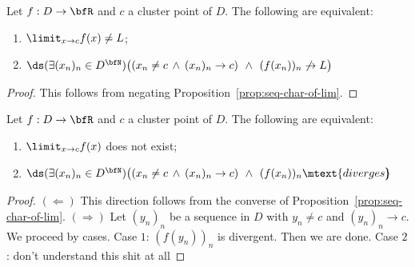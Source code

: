     \begin{theorem}
        Let $f:D \rightarrow \bfR$ and $c$ a cluster point of $D$. The following are equivalent:
            \begin{enumerate}[label = (\arabic*)]
                \item $\displaystyle \limit_{x \rightarrow c}f(x) \neq L$;
                \item $\ds (\exists (x_n)_n \in D^\bfN)\bigl((x_n \neq c \hspace{2pt}\land\hspace{2pt} (x_n)_n \rightarrow c)\hspace{4pt}\land\hspace{4pt} (f(x_n))_n \not\rightarrow L\bigr)$
            \end{enumerate}
    \end{theorem}
        \begin{proof}
            This follows from negating Proposition~\ref{prop:seq-char-of-lim}.
        \end{proof}

    \begin{theorem}
        Let $f:D \rightarrow \bfR$ and $c$ a cluster point of $D$. The following are equivalent:
        \begin{enumerate}[label = (\arabic*)]
            \item $\displaystyle \limit_{x \rightarrow c}f(x)$ does not exist;
            \item $\ds (\exists (x_n)_n \in D^\bfN)\bigl((x_n \neq c \hspace{2pt}\land\hspace{2pt} (x_n)_n \rightarrow c)\hspace{4pt}\land\hspace{4pt} (f(x_n))_n \mtext{diverges}\hspace{-5pt}\bigr)$
        \end{enumerate}
    \end{theorem}
        \begin{proof}
            $(\Leftarrow)$ This direction follows from the converse of Proposition~\ref{prop:seq-char-of-lim}. $(\Rightarrow)$ Let $(y_n)_n$ be a sequence in $D$  with $y_n \neq c$ and $(y_n)_n \rightarrow c$. We proceed by cases. Case $1$: $(f(y_n))_n$ is divergent. Then we are done. Case $2$: {\color{red} don't understand this shit at all}
        \end{proof}

